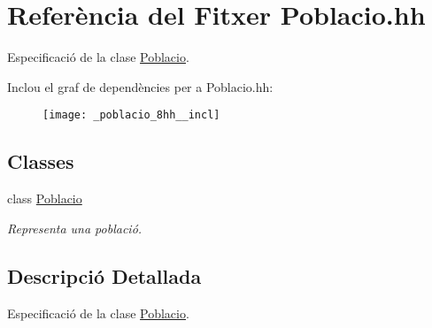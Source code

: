 \hypertarget{_poblacio_8hh}{}\section{Referència del Fitxer Poblacio.\+hh}
\label{_poblacio_8hh}


Especificació de la clase \hyperlink{class_poblacio}{Poblacio}.  


Inclou el graf de dependències per a Poblacio.\+hh\+:\nopagebreak
\begin{figure}[H]
\begin{center}
\leavevmode
\texttt{[image: \_poblacio\_8hh\_\_incl]}
\end{center}
\end{figure}
\subsection*{Classes}
\begin{DoxyCompactItemize}
\item 
class \hyperlink{class_poblacio}{Poblacio}
\begin{DoxyCompactList}\small\item\em Representa una població. \end{DoxyCompactList}\end{DoxyCompactItemize}


\subsection{Descripció Detallada}
Especificació de la clase \hyperlink{class_poblacio}{Poblacio}. 

